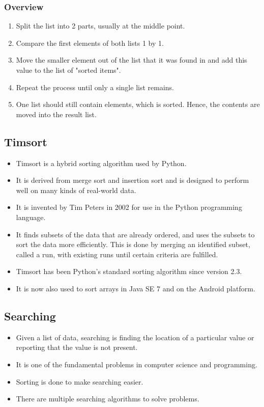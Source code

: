 \documentclass[11pt]{article}
\begin{document}
\subsubsection{Overview}
\label{sec:org3ff97c1}
\begin{enumerate}
\item Split the list into 2 parts, usually at the middle point.
\item Compare the first elements of both lists 1 by 1.
\item Move the smaller element out of the list that it was found in and add this value to the list of "sorted items".
\item Repeat the process until only a single list remains.
\item One list should still contain elements, which is sorted. Hence, the contents are moved into the result list.
\end{enumerate}

\subsection{Timsort}
\label{sec:org077f1de}
\begin{itemize}
\item Timsort is a hybrid sorting algorithm used by Python.
\item It is derived from merge sort and insertion sort and is designed to perform well on many kinds of real-world data.
\item It is invented by Tim Peters in 2002 for use in the Python programming language.
\item It finds subsets of the data that are already ordered, and uses the subsets to sort the data more efficiently. This is done by merging an identified subset, called a run, with existing runs until certain criteria are fulfilled.
\item Timsort has been Python's standard sorting algorithm since version 2.3.
\item It is now also used to sort arrays in Java SE 7 and on the Android platform.
\end{itemize}

\subsection{Searching}
\label{sec:orgb4cde09}
\begin{itemize}
\item Given a list of data, searching is finding the location of a particular value or reporting that the value is not present.
\item It is one of the fundamental problems in computer science and programming.
\item Sorting is done to make searching easier.
\item There are multiple searching algorithms to solve problems.
\end{itemize}
\end{document}
